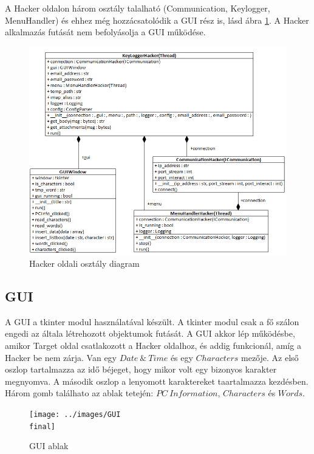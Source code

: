 \documentclass[12pt,a4paper,oneside]{report}
\begin{document}
A Hacker oldalon három osztály talalható (Communication, Keylogger, MenuHandler) és ehhez még hozzácsatolódik a GUI rész is, lásd ábra \ref{fig:serverclassdia}. A Hacker alkalmazás futását nem befolyásolja a GUI működése.
\begin{figure}[H]
\centering
\includegraphics[width=400pt]{../images/hackerclassdiagram}
\caption{Hacker oldali osztály diagram}
\label{fig:serverclassdia}
\end{figure}

\subsection{GUI}\label{subsubsec:gui}
A GUI a tkinter modul használatával készült. A tkinter modul csak a fő szálon engedi az általa létrehozott objektumok futását.
A GUI akkor lép működésbe, amikor Target oldal csatlakozott a Hacker oldalhoz, és addig funkcionál, amíg a Hacker be nem zárja. Van egy $Date\ \&\ Time$ és egy $Characters$ mezője. Az első oszlop tartalmazza az idő béjeget, hogy mikor volt egy bizonyos karakter megnyomva. A második oszlop a lenyomott karaktereket taartalmazza kezdésben. Három gomb találhato az ablak tetején: $PC\ Information$, $Characters$ és $Words$.
\begin{figure}[H]
\centering
\texttt{[image: ../images/GUI\\ final]}
\caption{GUI ablak}
\label{fig:gui}
\end{figure}
\end{document}

